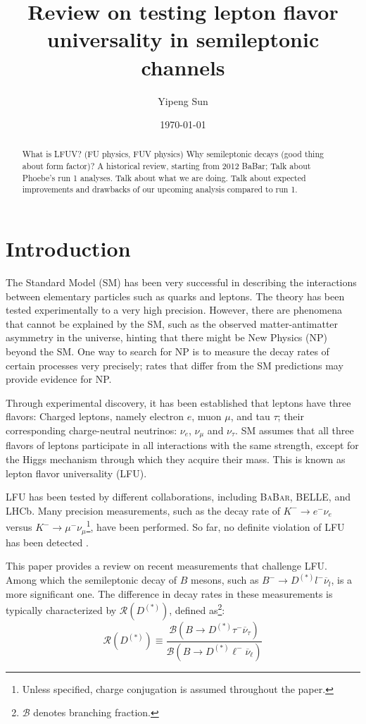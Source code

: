 \documentclass[12pt,letterpaper]{article}
\title{Review on testing lepton flavor universality in semileptonic channels}
\author{Yipeng Sun}
\affil{Department of Physics, University of Maryland}
\date{\today}
\def\BaBar/{\textsc{BaBar}}
\def\RDDst/{\ensuremath{\mathcal{R}(D^{(*)})}}
\begin{document}
\maketitle

\begin{abstract}
    What is LFUV? (FU physics, FUV physics)
    Why semileptonic decays (good thing about form factor)?
    A historical review, starting from 2012 BaBar;
    Talk about Phoebe's run 1 analyses.
    Talk about what we are doing.
    Talk about expected improvements and drawbacks of our upcoming analysis compared
    to run 1.
\end{abstract}

\section{Introduction}
The Standard Model (SM) has been very successful in describing the interactions
between elementary particles such as quarks and leptons.
The theory has been tested experimentally to a very high precision.
However, there are phenomena that cannot be explained by the SM, such as
the observed matter-antimatter asymmetry in the universe, hinting that there might be New Physics (NP) beyond the SM.
One way to search for NP is to measure the decay rates of certain processes
very precisely;
rates that differ from the SM predictions may provide evidence for NP.

Through experimental discovery, it has been established that leptons have three
flavors:
Charged leptons, namely electron $e$, muon $\mu$, and tau $\tau$;
their corresponding charge-neutral neutrinos: $\nu_e$, $\nu_\mu$ and $\nu_\tau$.
SM assumes that all three flavors of leptons participate in all
interactions with the same strength, except for the Higgs mechanism through which
they acquire their mass.
This is known as lepton flavor universality (LFU).

LFU has been tested by different collaborations, including \BaBar/, BELLE, and LHCb.
Many precision measurements, such as the decay rate
of $K^- \rightarrow e^- \nu_e$ versus $K^- \rightarrow \mu^- \nu_\mu$\footnote{
    Unless specified, charge conjugation is assumed throughout the paper.
}, have been performed.
So far, no definite violation of LFU has been detected \cite{Ciezarek:2017yzh}.

This paper provides a review on recent measurements that challenge LFU.
Among which the semileptonic decay of $B$ mesons, such as
$B^- \rightarrow D^{(*)} l^- \overline{\nu}_l$, is a more significant one.
The difference in decay rates in these measurements is typically characterized by \RDDst/,
defined as\footnote{
    $\mathcal{B}$ denotes branching fraction.
}:
\begin{equation}
    \RDDst/ \equiv \frac{
        \mathcal{B}\left(
            B \rightarrow D^{(*)} \tau^- \overline{\nu}_\tau
        \right)
    }{
        \mathcal{B}\left(
            B \rightarrow D^{(*)} \ell^- \overline{\nu}_\ell
        \right)
    }
\end{equation}
\end{document}
